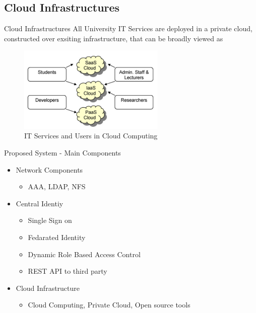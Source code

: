 \documentclass[xcolor=dvipsnames]{beamer}
\begin{document}
\subsection{Cloud Infrastructures}
\begin{frame}{Cloud Infrastructures}
All University IT Services are deployed in a private cloud, constructed over exsiting infrastructure, that can be broadly viewed as 
	
\begin{figure}[H]
\begin{center}
\includegraphics[width=7cm]{./it2.png}
\caption{ IT Services and Users in Cloud Computing\label{fig:IT Services and Users in Cloud Computing }}
\end{center}
\end{figure}	
	
	
\end{frame}

\begin{frame}{Proposed System -  Main Components}
\begin{itemize}
	
	\item Network Components 
	\begin{itemize}
		\item AAA, LDAP, NFS
	\end{itemize}
	\item Central Identiy 
	\begin{itemize}
		\item Single Sign on
		\item Fedarated Identity
		\item Dynamic Role Based Access Control
		\item REST API to third party
	\end{itemize}
	\item Cloud Infrastructure
	\begin{itemize}
		\item Cloud Computing, Private Cloud, Open source tools
	\end{itemize}
\end{itemize}
\end{frame}
\end{document}
